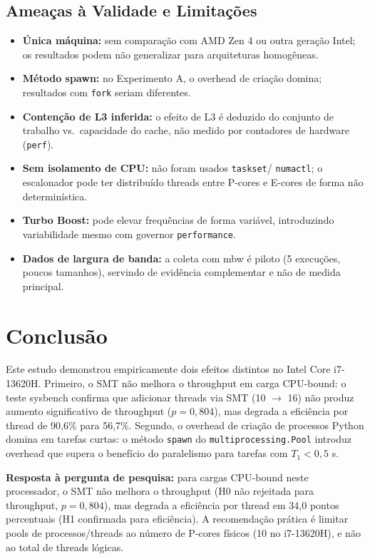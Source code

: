 \documentclass[12pt]{article}
\begin{document}
\subsection{Ameaças à Validade e Limitações}

\begin{itemize}
  \item \textbf{Única máquina:} sem comparação com AMD Zen 4 ou outra geração
  Intel; os resultados podem não generalizar para arquiteturas homogêneas.
  \item \textbf{Método spawn:} no Experimento A, o overhead de criação domina;
  resultados com \texttt{fork} seriam diferentes.
  \item \textbf{Contenção de L3 inferida:} o efeito de L3 é deduzido do
  conjunto de trabalho vs.\ capacidade do cache, não medido por contadores de
  hardware (\texttt{perf}).
  \item \textbf{Sem isolamento de CPU:} não foram usados \texttt{taskset}/
  \texttt{numactl}; o escalonador pode ter distribuído threads entre P-cores e
  E-cores de forma não determinística.
  \item \textbf{Turbo Boost:} pode elevar frequências de forma variável,
  introduzindo variabilidade mesmo com governor \texttt{performance}.
  \item \textbf{Dados de largura de banda:} a coleta com mbw é piloto (5
  execuções, poucos tamanhos), servindo de evidência complementar e não de
  medida principal.
\end{itemize}

\section{Conclusão}
\label{sec:conclusao}

Este estudo demonstrou empiricamente dois efeitos distintos no Intel Core
i7-13620H. Primeiro, o SMT não melhora o throughput em carga CPU-bound: o teste
sysbench confirma que adicionar threads via SMT (10 $\rightarrow$ 16) não
produz aumento significativo de throughput ($p = 0{,}804$), mas degrada a
eficiência por thread de 90,6\% para 56,7\%. Segundo, o overhead de criação de
processos Python domina em tarefas curtas: o método \texttt{spawn} do
\texttt{multiprocessing.Pool} introduz overhead que supera o benefício do
paralelismo para tarefas com $T_1 < 0{,}5$ s.

\textbf{Resposta à pergunta de pesquisa:} para cargas CPU-bound neste
processador, o SMT não melhora o throughput (H0 não rejeitada para throughput,
$p = 0{,}804$), mas degrada a eficiência por thread em 34,0 pontos percentuais
(H1 confirmada para eficiência). A recomendação prática é limitar pools de
processos/threads ao número de P-cores físicos (10 no i7-13620H), e não ao
total de threads lógicas.
\end{document}
